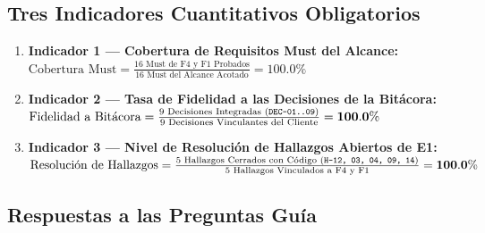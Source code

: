 \documentclass[11pt,letterpaper]{article}
\begin{document}
\subsection{Tres Indicadores Cuantitativos Obligatorios}
\begin{enumerate}[leftmargin=*]
    \item \textbf{Indicador 1 — Cobertura de Requisitos Must del Alcance:}
    $\text{Cobertura Must} = \frac{16\text{ Must de F4 y F1 Probados}}{16\text{ Must del Alcance Acotado}} = \mathbf{100.0\%}$
    \item \textbf{Indicador 2 — Tasa de Fidelidad a las Decisiones de la Bitácora:}
    $\text{Fidelidad a Bitácora} = \frac{9\text{ Decisiones Integradas (\texttt{DEC-01..09})}}{9\text{ Decisiones Vinculantes del Cliente}} = \mathbf{100.0\%}$
    \item \textbf{Indicador 3 — Nivel de Resolución de Hallazgos Abiertos de E1:}
    $\text{Resolución de Hallazgos} = \frac{5\text{ Hallazgos Cerrados con Código (\texttt{H-12, 03, 04, 09, 14})}}{5\text{ Hallazgos Vinculados a F4 y F1}} = \mathbf{100.0\%}$
\end{enumerate}

\subsection{Respuestas a las Preguntas Guía}
\end{document}
